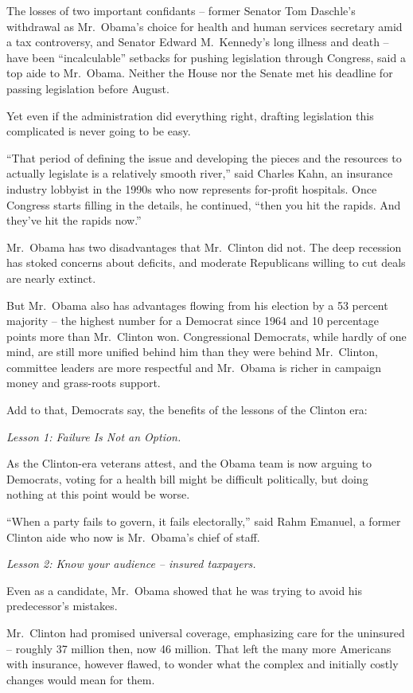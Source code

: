﻿\documentclass[12pt]{article}
\begin{document}
The losses of two important confidants -- former Senator Tom Daschle's withdrawal as Mr.~Obama's
choice for health and human services secretary amid a tax controversy, and Senator Edward
M.~Kennedy's long illness and death -- have been ``incalculable'' setbacks for pushing legislation
through Congress, said a top aide to Mr.~Obama. Neither the House nor the Senate met his deadline
for passing legislation before August.

Yet even if the administration did everything right, drafting legislation this complicated is never
going to be easy.

``That period of defining the issue and developing the pieces and the resources to actually
legislate is a relatively smooth river,'' said Charles Kahn, an insurance industry lobbyist in the
1990s who now represents for-profit hospitals. Once Congress starts filling in the details, he
continued, ``then you hit the rapids. And they've hit the rapids now.''

Mr.~Obama has two disadvantages that Mr.~Clinton did not. The deep recession has stoked concerns
about deficits, and moderate Republicans willing to cut deals are nearly extinct.

But Mr.~Obama also has advantages flowing from his election by a 53 percent majority -- the highest
number for a Democrat since 1964 and 10 percentage points more than Mr.~Clinton won. Congressional
Democrats, while hardly of one mind, are still more unified behind him than they were behind
Mr.~Clinton, committee leaders are more respectful and Mr.~Obama is richer in campaign money and
grass-roots support.

Add to that, Democrats say, the benefits of the lessons of the Clinton era:

\emph{Lesson 1: Failure Is Not an Option.}

As the Clinton-era veterans attest, and the Obama team is now arguing to Democrats, voting for a
health bill might be difficult politically, but doing nothing at this point would be worse.

``When a party fails to govern, it fails electorally,'' said Rahm Emanuel, a former Clinton aide who
now is Mr.~Obama's chief of staff.

\emph{Lesson 2: Know your audience -- insured taxpayers.}


Even as a candidate, Mr.~Obama showed that he was trying to avoid his predecessor's mistakes.

Mr.~Clinton had promised universal coverage, emphasizing care for the uninsured -- roughly 37
million then, now 46 million. That left the many more Americans with insurance, however flawed, to
wonder what the complex and initially costly changes would mean for them.
\end{document}
